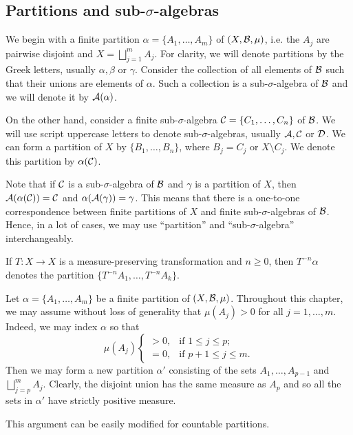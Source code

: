 \subsection{Partitions and sub-\texorpdfstring{$\sigma$}{sigma}-algebras}

We begin with a finite partition $\alpha = \{A_1, \dots, A_m\}$ of $(X, \mathcal{B}, \mu)$, i.e. the $A_j$ are pairwise disjoint and $X = \bigsqcup_{j = 1}^m{A_j}$. For clarity, we will denote partitions by the Greek letters, usually $\alpha, \beta$ or $\gamma$. Consider the collection of all elements of $\mathcal{B}$ such that their unions are elements of $\alpha$. Such a collection is a sub-$\sigma$-algebra of $\mathcal{B}$ and we will denote it by $\mathcal{A}(\alpha)$.

On the other hand, consider a finite sub-$\sigma$-algebra $\mathcal{C} = \{C_1, \dots, C_n\}$ of $\mathcal{B}$. We will use script uppercase letters to denote sub-$\sigma$-algebras, usually $\mathcal{A}, \mathcal{C}$ or $\mathcal{D}$. We can form a partition of $X$ by $\{B_1, \dots, B_n\}$, where $B_j = C_j$ or $X \setminus C_j$. We denote this partition by $\alpha(\mathcal{C})$.

Note that if $\mathcal{C}$ is a sub-$\sigma$-algebra of $\mathcal{B}$ and $\gamma$ is a partition of $X$, then $\mathcal{A}(\alpha(\mathcal{C})) = \mathcal{C}$ and $\alpha(\mathcal{A}(\gamma)) = \gamma$. This means that there is a one-to-one correspondence between finite partitions of $X$ and finite sub-$\sigma$-algebras of $\mathcal{B}$. Hence, in a lot of cases, we may use ``partition'' and ``sub-$\sigma$-algebra'' interchangeably.

If $T: X \to X$ is a measure-preserving transformation and $n \geq 0$, then $T^{-n}{\alpha}$ denotes the partition $\{T^{-n}{A_1}, \dots, T^{-n}{A_k}\}$.

\begin{remark}
	Let $\alpha = \{A_1, \dots, A_m\}$ be a finite partition of $(X, \mathcal{B}, \mu)$. Throughout this chapter, we may assume without loss of generality that $\mu(A_j) > 0$ for all $j = 1, \dots, m$. Indeed, we may index $\alpha$ so that
	\[
		\mu(A_j)
		\begin{cases}
			> 0, & \text{if } 1 \leq j \leq p; \\
			= 0, & \text{if } p + 1 \leq j \leq m.
		\end{cases}
	\]
	Then we may form a new partition $\alpha'$ consisting of the sets $A_1, \dots, A_{p - 1}$ and $\bigsqcup_{j = p}^m{A_j}$. Clearly, the disjoint union has the same measure as $A_p$ and so all the sets in $\alpha'$ have strictly positive measure.
	
	This argument can be easily modified for countable partitions.
\end{remark}

